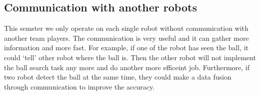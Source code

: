 \subsection{Communication with another robots}
This semster we only operate on each single robot without communication with another team players. The communication is very useful and it can gather more information and more fast. For example, if one of the robot has seen the ball, it could `tell' other robot where the ball is. Then the other robot will not implement the ball search task any more and do another more efficeint job. Furthermore, if two robot detect the ball at the same time, they could make a data fusion through communication to improve the accuracy.

